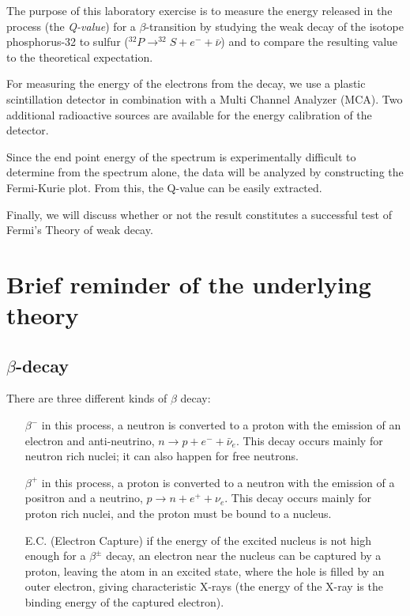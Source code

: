 \documentclass[a4,11pt, notitlepage]{article}
\begin{document}
The purpose of this laboratory exercise is to measure the energy
released in the process (the \textit{Q-value}) for a
$\beta$-transition by studying the weak decay of the isotope
phosphorus-32 to sulfur ($^{32}P\rightarrow ^{32}S + e^- + \bar{\nu}$) and to compare the
resulting value to the theoretical expectation. 

For measuring the energy of the electrons from the decay, we use a
plastic scintillation detector in combination with a Multi Channel
Analyzer (MCA). Two additional radioactive sources are available for
the energy calibration of the detector.

Since the end point energy of the spectrum is experimentally difficult
to determine from the spectrum alone, the data will be analyzed by
constructing the Fermi-Kurie plot. From this, the Q-value can be
easily extracted.

Finally, we will discuss whether or not the result constitutes a
successful test of Fermi's Theory of weak decay.

\section{Brief reminder of the underlying theory}
\subsection{$\beta$-decay}

There are three different kinds of $\beta$ decay:
\begin{itemize}
\item[$\beta^-$] in this process, a neutron is converted to a proton
  with the emission of an electron and anti-neutrino,
  $n\rightarrow p + e^- + \bar \nu_e$. This decay occurs mainly for
  neutron rich nuclei; it can also happen for free neutrons.
\item[$\beta^+$] in this process, a proton is converted to a neutron
  with the emission of a positron and a neutrino,
  $p\rightarrow n + e^+ + \nu_e$. This decay occurs mainly for
  proton rich nuclei, and the proton must be bound to a nucleus.
\item[E.C.] (Electron Capture) if the energy of the excited nucleus is
  not high enough for a $\beta^{\pm}$ decay, an electron near the
  nucleus can be captured by a proton, leaving the atom in an excited
  state, where the hole is filled by an outer electron, giving
  characteristic X-rays (the energy of the X-ray is the binding energy
  of the captured electron).
\end{itemize}
\end{document}
